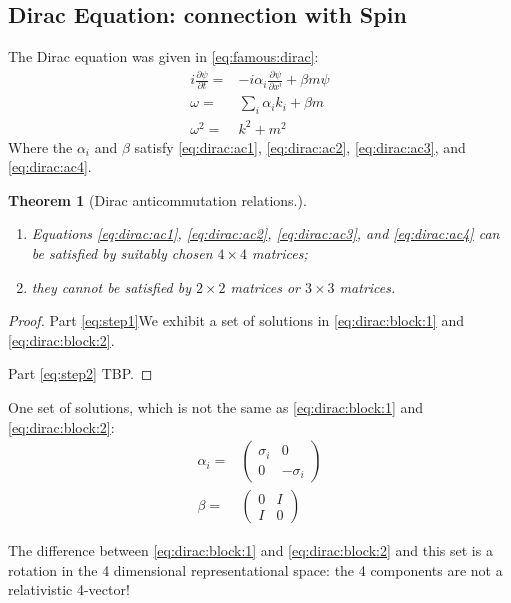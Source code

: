 \documentclass[]{article}
\newtheorem{thm}{Theorem}
\begin{document}
\subsection{Dirac Equation: connection with Spin}

The Dirac equation was given in \eqref{eq:famous:dirac}:
\begin{align*}
	i \frac{\partial \psi}{\partial t} =& - i \alpha_i \frac{\partial \psi}{\partial x^i} + \beta m \psi\\
	\omega =& \sum_i \alpha_i k_i + \beta m\\
	\omega^2 =& k^2 + m^2
\end{align*}
Where the $\alpha_i$ and $\beta$ satisfy \eqref{eq:dirac:ac1}, \eqref{eq:dirac:ac2}, \eqref{eq:dirac:ac3}, and \eqref{eq:dirac:ac4}.

\begin{thm}[Dirac anticommutation relations.]\label{thm:dirac:anticommutation} 
	\begin{enumerate}
		\item Equations \eqref{eq:dirac:ac1}, \eqref{eq:dirac:ac2}, \eqref{eq:dirac:ac3}, and \eqref{eq:dirac:ac4} can be satisfied by suitably chosen $4\times4$ matrices\label{eq:step1};
		\item  they cannot be satisfied by $2 \times 2$ matrices or $3 \times 3$ matrices\label{eq:step2}.
	\end{enumerate}
\end{thm}
\begin{proof}
	 Part \ref{eq:step1}We exhibit a set of solutions in \eqref{eq:dirac:block:1} and \eqref{eq:dirac:block:2}.
	 
	 Part \ref{eq:step2} TBP.
\end{proof}

One set of solutions, which is not the same as \eqref{eq:dirac:block:1} and \eqref{eq:dirac:block:2}:
\begin{align*}
	\alpha_i=&\begin{pmatrix}
		\sigma_i&0\\
		0&-\sigma_i
	\end{pmatrix}\\
	\beta =& \begin{pmatrix}
		0&I\\
		I&0
	\end{pmatrix}
\end{align*}

The difference between \eqref{eq:dirac:block:1} and \eqref{eq:dirac:block:2} and this set is a rotation in the 4 dimensional representational space: the 4 components are not a relativistic 4-vector!
\end{document}
